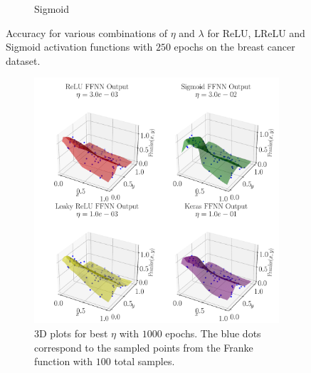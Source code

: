 \documentclass[%
reprint,s
amsmath,amssymb,
aps,
]{revtex4-2}
\begin{document}
\begin{figure}[ht!]
\begin{subfigure}{0.4353\textwidth}
		\caption{Sigmoid}
		\label{fig:Sigmoid_heatmap}
	\end{subfigure}
	\caption{Accuracy for various combinations of $\eta$ and $\lambda$ for ReLU, LReLU and Sigmoid activation functions with $250$ epochs on the breast cancer dataset.}
	\label{fig:FFNN_cancer_heatmaps}
\end{figure}
\begin{figure}[ht!]
	\begin{subfigure}[b]{0.49\textwidth}
		\includegraphics[width=\textwidth]{Python/Figures/NN_3D_Predict_Franke_Epochs1000.pdf}
		\caption{3D plots for best $\eta$ with $1000$ epochs. The blue dots correspond to the sampled points from the Franke function with $100$ total samples.}
		\label{fig:3D_Franke}
	\end{subfigure}
	\hfill
	\begin{subfigure}[b]{0.49\textwidth}

\end{subfigure}
\end{figure}
\end{document}
